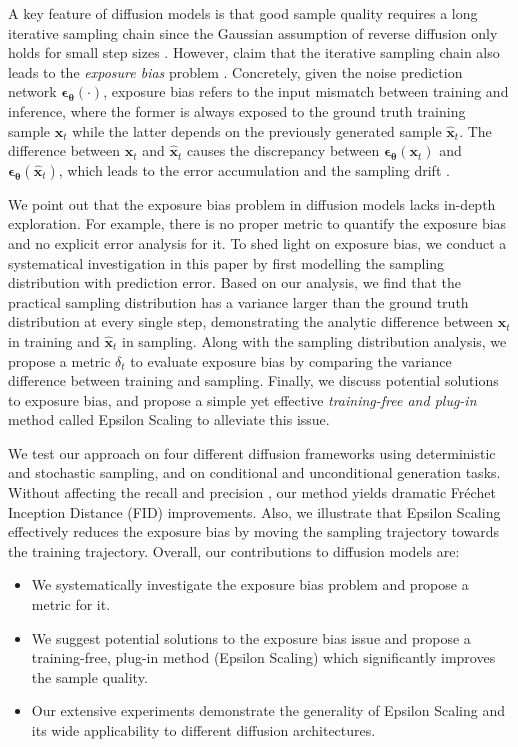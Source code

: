 \documentclass{article} \usepackage{iclr2024_conference,times}
\begin{document}
A key feature of diffusion models is that good sample quality requires a long iterative sampling chain since the Gaussian assumption of reverse diffusion only holds for small step sizes \citep{xiao2022tackling}. However, \citet{ning2023input} claim that the iterative sampling chain also leads to the 
\textit{exposure bias} problem \citep{DBLP:journals/corr/RanzatoCAZ15,DBLP:conf/emnlp/Schmidt19}. Concretely, given the noise prediction network $\pmb{\epsilon_{\theta}}(\cdot)$, exposure bias refers to the input mismatch between training and inference, where the former is always exposed to the ground truth training sample $\pmb{x}_t$ while the latter depends on the previously generated sample $\hat{\pmb{x}}_t$. The difference between $\pmb{x}_t$ and $\hat{\pmb{x}}_t$ causes the discrepancy between $\pmb{\epsilon_{\theta}}(\pmb{x}_t)$ and $\pmb{\epsilon_{\theta}}(\hat{\pmb{x}}_t)$, which leads to the error accumulation and the sampling drift \citep{li2023alleviating}. 

We point out that the exposure bias problem in diffusion models lacks in-depth exploration. For example, there is no proper metric to quantify the exposure bias and no explicit error analysis for it. To shed light on exposure bias, we conduct a systematical investigation in this paper by first modelling the sampling distribution with prediction error. Based on our analysis, we find that the practical sampling distribution has a variance larger than the ground truth distribution at every single step, demonstrating the analytic difference between $\pmb{x}_{t}$ in training and $\hat{\pmb{x}}_{t}$ in sampling. Along with the sampling distribution analysis, we propose a metric $\delta_t$ to evaluate exposure bias by comparing the variance difference between training and sampling. Finally, we discuss potential solutions to exposure bias, and propose a simple yet effective \textit{training-free and plug-in} method called Epsilon Scaling to alleviate this issue. 

We test our approach on four different diffusion frameworks using deterministic and stochastic sampling, and on conditional and unconditional generation tasks. Without affecting the recall and precision \citep{kynkaanniemi2019improved}, our method yields dramatic Fréchet Inception Distance (FID) \citep{FID} improvements. Also, we illustrate that Epsilon Scaling effectively reduces the exposure bias by moving the sampling trajectory towards the training trajectory. Overall, our contributions to diffusion models are:
\begin{itemize}
    \item We systematically investigate the exposure bias problem and propose a metric for it.
    \item We suggest potential solutions to the exposure bias issue and propose a training-free, plug-in method (Epsilon Scaling) which significantly improves the sample quality.
    \item Our extensive experiments demonstrate the generality of Epsilon Scaling and its wide applicability to different diffusion architectures.
\end{itemize}
\end{document}
